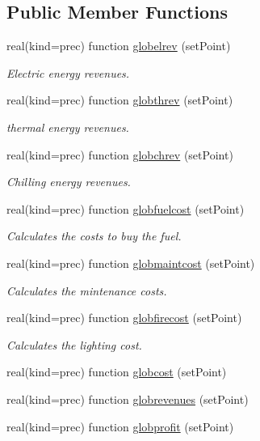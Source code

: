 \subsection*{Public Member Functions}
\begin{DoxyCompactItemize}
\item 
real(kind=prec) function \hyperlink{classglobalresults_ac009a3d3d776d80a58d143c137dd9426}{globelrev} (set\-Point)
\begin{DoxyCompactList}\small\item\em Electric energy revenues. \end{DoxyCompactList}\item 
real(kind=prec) function \hyperlink{classglobalresults_aed1df63c124b3ac76809e37374672f26}{globthrev} (set\-Point)
\begin{DoxyCompactList}\small\item\em thermal energy revenues. \end{DoxyCompactList}\item 
real(kind=prec) function \hyperlink{classglobalresults_a972ef181b25a59b4f9325c85b021149e}{globchrev} (set\-Point)
\begin{DoxyCompactList}\small\item\em Chilling energy revenues. \end{DoxyCompactList}\item 
real(kind=prec) function \hyperlink{classglobalresults_a5e2fcd8b1f2a5d2ffa7be6e316a54d8d}{globfuelcost} (set\-Point)
\begin{DoxyCompactList}\small\item\em Calculates the costs to buy the fuel. \end{DoxyCompactList}\item 
real(kind=prec) function \hyperlink{classglobalresults_a94041d2c7b3dd5969c1abcf1e9546e65}{globmaintcost} (set\-Point)
\begin{DoxyCompactList}\small\item\em Calculates the mintenance costs. \end{DoxyCompactList}\item 
real(kind=prec) function \hyperlink{classglobalresults_aaa04d5674fda6eda87d3896259835080}{globfirecost} (set\-Point)
\begin{DoxyCompactList}\small\item\em Calculates the lighting cost. \end{DoxyCompactList}\item 
real(kind=prec) function \hyperlink{classglobalresults_a0edf7ae83d7b521a5b8f0c4d7b87dddc}{globcost} (set\-Point)
\item 
real(kind=prec) function \hyperlink{classglobalresults_ad14556fe1ddf08129231242d3716028e}{globrevenues} (set\-Point)
\item 
real(kind=prec) function \hyperlink{classglobalresults_afd33ba4d9415e6eba9f99590f55d71a8}{globprofit} (set\-Point)
\end{DoxyCompactItemize}


